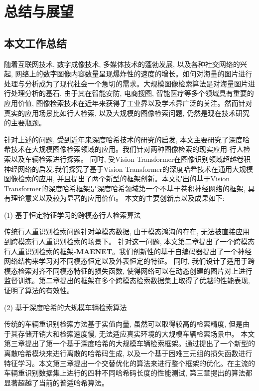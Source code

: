 \chapter{总结与展望}
\section{本文工作总结}
随着互联网技术, 数字成像技术, 多媒体技术的蓬勃发展, 以及各种社交网络的兴起, 网络上的数字图像内容数量呈现爆炸性的速度的增长。如何对海量的图片进行处理与分析成为了现代社会一个急切的需求。大规模图像检索算法是对海量图片进行处理分析的基石, 由于其在智能安防, 电商搜图, 智能医疗等多个领域具有重要的应用价值, 图像检索技术在近年来获得了工业界以及学术界广泛的关注。然而针对真实的应用场景比如行人检索, 以及大规模的图像检索问题, 仍然是现在技术研究的主要瓶颈。 \par
针对上述的问题, 受到近年来深度哈希技术的研究的启发, 本文主要研究了深度哈希技术在大规模图像检索领域的应用。我们针对两种图像检索的现实应用-行人检索以及车辆检索进行探索。 同时, 受Vision Transformer在图像识别领域超越卷积神经网络的启发,我们探究了基于Vision Transformer的深度哈希技术在通用大规模图像检索的应用, 并且提出了两个新型的框架创新。本文提出的基于Vision Transformer的深度哈希框架是深度哈希领域第一个不基于卷积神经网络的框架, 具有理论意义以及较为显著的应用价值。 本文的主要创新点以及成果如下:\par
(1) 基于恒定特征学习的跨模态行人检索算法 \par
传统行人重识别检索问题针对单模态数据, 由于模态鸿沟的存在, 无法被直接应用到跨模态行人重识别检索的场景下。 针对这一问题, 本文第二章提出了一个跨模态行人重识别检索的框架-\textbf{MAENET}。我们创新性的基于自编码器提出了一个神经网络结构来学习对不同模态恒定以及外表恒定的特征。 同时, 我们设计了适用于跨模态检索对齐不同模态特征的损失函数, 使得网络可以在动态创建的图片对上进行监督训练。第二章提出的框架在多个跨模态检索数据集上取得了优越的性能表现, 证明了算法的有效性。\par 
(2) 基于深度哈希的大规模车辆检索算法 \par
传统的车辆重识别检索方法基于实值向量, 虽然可以取得较高的检索精度, 但是由于其存储开销大和检索速度慢, 无法适应真实环境的大规模车辆检索场景中。 本文第三章提出了第一个基于深度哈希的大规模车辆检索框架。通过提出了一个新型的离散哈希模块来进行离散的哈希码生成, 以及一个基于困难三元组的损失函数进行特征学习。本文第三章提出一个交替优化的算法来进行整个框架的优化。在主流的车辆重识别数据集上进行的四种不同哈希码长度的性能测试, 第三章提出的算法都显著超越了当前的普适哈希算法。 \par
